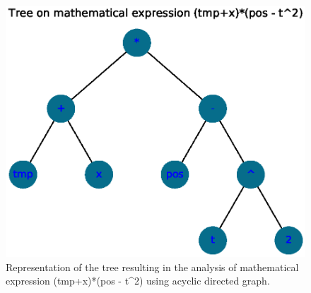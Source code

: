 \documentclass{article}
\begin{document}


\begin{figure}[!ht]
  \includegraphics[width=.8\columnwidth]{images/NF_H1_graph_sect04.eps}
  \caption{Representation of the tree resulting in the analysis of mathematical expression (tmp+x)*(pos - t^2) using acyclic directed graph.}
  \label{fig:CDSG01}
\end{figure}

\section{}
\section{}
\section{}
\section{}
\section{}
\section{}
\section{}
\section{}


\newpage


\end{document}
